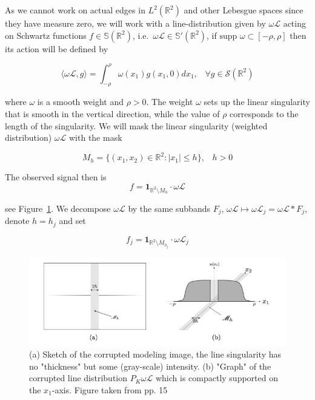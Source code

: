 \bigskip

As we cannot work on actual edges in $L^2(\mathbb{R}^2)$ and other Lebesgue spaces since they have measure zero, we will work with a line-distribution given by $\omega\mathcal{L}$ acting on Schwartz functions $f\in\mathbb{S}(\mathbb{R}^2)$, i.e.\ $\omega\mathcal{L}\in \mathbb{S}'(\mathbb{R}^2)$, if $\text{supp }\omega\subset[-\rho,\rho]$ then its action will be defined by

$$
\langle \omega \mathcal{L},g\rangle = \int_{-\rho}^{\rho} \omega(x_1)g(x_1,0)dx_1 \textrm{,}\quad \forall g\in\mathcal{S}(\mathbb{R}^2)
$$

where $\omega$ is a smooth weight and $\rho>0$. The weight $\omega$ sets up the linear singularity that is smooth in the vertical direction, while the value of $\rho$ corresponds to the length of the singularity. We will mask the linear singularity (weighted distribution) $\omega\mathcal{L}$ with the mask 

$$
M_h=\{(x_1,x_2)\in\mathbb{R}^2:|x_1|\leq h\}\textrm{,}\quad h>0
$$

The observed signal then is 
$$
f=\mathbf{1}_{\mathbb{R}^2\setminus M_h}\cdot \omega\mathcal{L}
$$ 

see Figure~\ref{fig:alpha6}. We decompose $\omega\mathcal{L}$ by the same subbands $F_j$, $\omega\mathcal{L}\mapsto \omega\mathcal{L}_j=\omega\mathcal{L}*F_j$, denote $h=h_j$ and set 

$$
f_j=\mathbf{1}_{\mathbb{R}^2\setminus M_{h_j}}\cdot \omega\mathcal{L}_j
$$

\begin{figure}[h!]
\centering
\includegraphics[width = 0.9 \textwidth]{./Diagrams/alpha6.jpg}
\caption{(a) Sketch of the corrupted modeling image, the line singularity has no "thickness" but some (gray-scale) intensity. (b) "Graph" of the corrupted line distribution $P_K\omega\mathcal{L}$ which is compactly supported on the $x_1$-axis. Figure taken from \cite{Gitta-alpha} pp. 15}
\label{fig:alpha6}
\end{figure}

\bigskip

